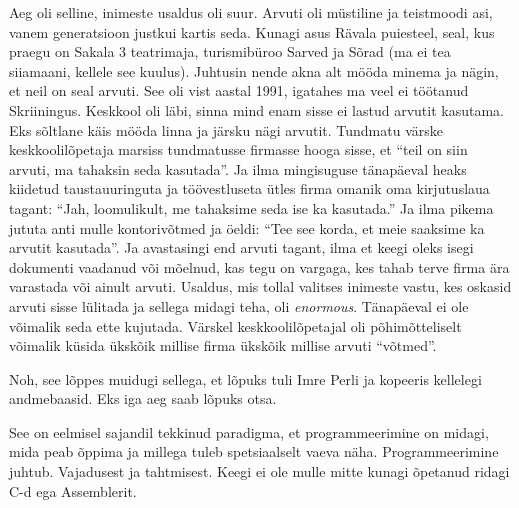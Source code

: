 
Aeg oli selline, inimeste usaldus oli suur. Arvuti oli müstiline ja teistmoodi 
asi, vanem 
generatsioon justkui kartis seda. Kunagi asus Rävala puiesteel, seal, kus 
praegu on Sakala 3 teatrimaja, turismibüroo Sarved ja Sõrad (ma ei tea siiamaani, kellele see kuulus). Juhtusin nende akna alt mööda 
minema ja nägin, et neil on 
seal arvuti. See oli vist aastal 1991, igatahes ma veel ei töötanud 
Skriiningus. Keskkool 
oli läbi, sinna mind enam sisse ei lastud arvutit kasutama. Eks sõltlane käis 
mööda linna ja järsku nägi arvutit. Tundmatu värske keskkoolilõpetaja 
marsiss tundmatusse firmasse hooga sisse, et 
\enquote{teil on siin arvuti, ma tahaksin seda kasutada}. Ja ilma mingisuguse 
tänapäeval heaks kiidetud taustauuringuta ja töövestluseta ütles firma omanik 
oma kirjutuslaua tagant: \enquote{Jah, loomulikult, me tahaksime seda ise ka 
kasutada.} Ja ilma 
pikema jututa anti mulle kontorivõtmed ja öeldi: \enquote{Tee 
see korda, et meie saaksime ka arvutit kasutada}. Ja avastasingi end
arvuti tagant, ilma et keegi oleks isegi dokumenti vaadanud või mõelnud, kas 
tegu on
vargaga, kes tahab terve firma ära varastada või 
ainult arvuti. Usaldus, mis tollal valitses inimeste vastu, kes 
oskasid arvuti sisse lülitada ja sellega midagi teha, oli 
\emph{enormous}.\label{sisu:andrus_usaldus} 
Tänapäeval ei ole võimalik seda ette kujutada. Värskel keskkoolilõpetajal oli 
põhimõtteliselt võimalik küsida ükskõik millise firma ükskõik millise  
arvuti \enquote{võtmed}. 

Noh, see lõppes muidugi sellega, et lõpuks tuli Imre Perli ja kopeeris kellelegi andmebaasid. Eks iga 
aeg saab lõpuks otsa. 


See on eelmisel sajandil tekkinud paradigma, et 
programmeerimine on midagi, mida peab õppima ja millega tuleb 
spetsiaalselt vaeva näha. Programmeerimine juhtub. Vajadusest ja tahtmisest. 
Keegi ei ole mulle mitte kunagi õpetanud 
ridagi C-d ega Assemblerit. 

